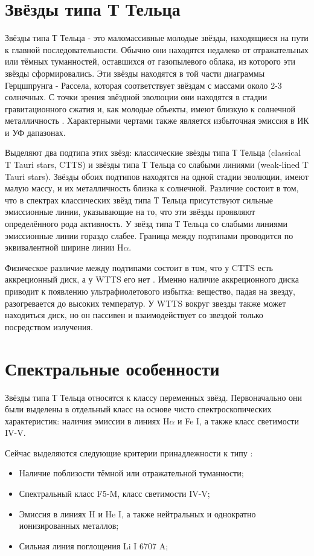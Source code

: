 
\section{Звёзды типа Т Тельца}
Звёзды типа Т Тельца - это маломассивные молодые звёзды, находящиеся на пути к главной последовательности. Обычно они находятся недалеко от отражательных или тёмных туманностей, оставшихся от газопылевого облака, из которого эти звёзды сформировались. Эти звёзды находятся в той части диаграммы Герцшпрунга - Рассела, которая соответствует звёздам с массами около 2-3 солнечных. С точки зрения звёздной эволюции они находятся в стадии гравитационного сжатия и, как молодые объекты, имеют близкую к солнечной металличность \cite{dod2013}. Характерными чертами также является избыточная эмиссия в ИК и УФ дапазонах.

Выделяют два подтипа этих звёзд: классические звёзды типа Т Тельца (classical T Tauri stars, CTTS) и звёзды типа Т Тельца со слабыми линиями (weak-lined T Tauri stars). Звёзды обоих подтипов находятся на одной стадии эволюции, имеют малую массу, и их металличность близка к солнечной. Различие состоит в том, что в спектрах классических звёзд типа Т Тельца присутствуют сильные эмиссионные линии, указывающие на то, что эти звёзды проявляют определённого рода активность. У звёзд типа Т Тельца со слабыми линиями эмиссионные линии гораздо слабее. Граница между подтипами проводится по эквивалентной ширине линии H$\alpha$. 

Физическое различие между подтипами состоит в том, что у CTTS есть аккреционный диск, а у WTTS его нет \cite{petrov2003t}. Именно наличие аккреционного диска приводит к появлению ультрафиолетового избытка: вещество, падая на звезду, разогревается до высоких температур. У WTTS вокруг звезды также может находиться диск, но он пассивен и взаимодействует со звездой только посредством излучения.


\section{Спектральные особенности}
Звёзды типа Т Тельца относятся к классу переменных звёзд. Первоначально они были выделены в отдельный класс на основе чисто спектроскопических характеристик: наличия эмиссии в линиях H$\alpha$ и Fe I, а также класс светимости IV-V. 

Сейчас выделяются следующие критерии принадлежности к типу \cite{dod2013}:
\begin{itemize}
	\item Наличие поблизости тёмной или отражательной туманности;
	\item	Спектральный класс F5-M, класс светимости IV-V;
	\item	Эмиссия в линиях H и He I, а также нейтральных и однократно ионизированных металлов;
	\item	Сильная линия поглощения Li I 6707 A;
\end{itemize}

